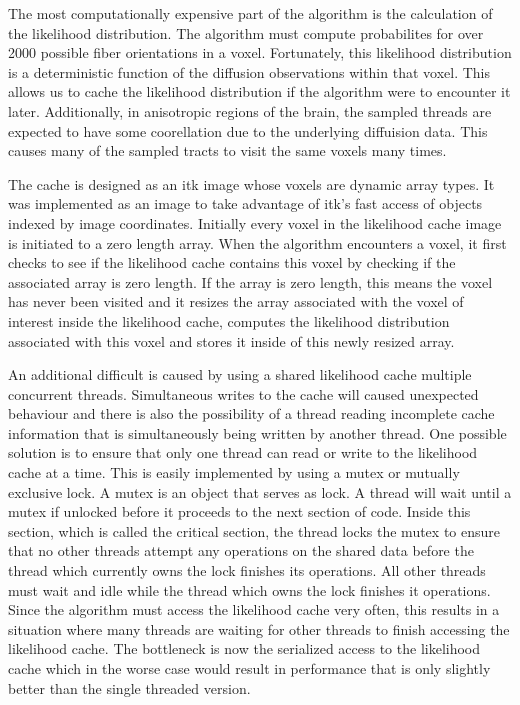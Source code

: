 The most computationally expensive part of the algorithm is the calculation of the likelihood distribution.  The algorithm must compute probabilites for over 2000 possible fiber orientations in a voxel.  Fortunately, this likelihood distribution is a deterministic function of the diffusion observations within that voxel.  This allows us to cache the likelihood distribution if the algorithm were to encounter it later.  Additionally, in anisotropic regions of the brain, the sampled threads are expected to have some coorellation due to the underlying diffuision data.  This causes many of the sampled tracts to visit the same voxels many times.  

The cache is designed as an itk image whose voxels are dynamic array types.  It was implemented as an image to take advantage of itk's fast access of objects indexed by image coordinates.  Initially every voxel in the likelihood cache image is initiated to a zero length array.  When the algorithm encounters a voxel, it first checks to see if the likelihood cache contains this voxel by checking if the associated array is zero length.  If the array is zero length, this means the voxel has never been visited and it resizes the array associated with the voxel of interest inside the likelihood cache, computes the likelihood distribution associated with this voxel and stores it inside of this newly resized array.

An additional difficult is caused by using a shared likelihood cache multiple concurrent threads.  Simultaneous writes to the cache will caused unexpected behaviour and there is also the possibility of a thread reading incomplete cache information that is simultaneously being written by another thread.  One possible solution is to ensure that only one thread can read or write to the likelihood cache at a time.  This is easily implemented by using a mutex or mutually exclusive lock.  A mutex is an object that serves as lock.  A thread will wait until a mutex if unlocked before it proceeds to the next section of code.  Inside this section, which is called the critical section, the thread locks the mutex to ensure that no other threads attempt any operations on the shared data before the thread which currently owns the lock finishes its operations.  All other threads must wait and idle while the thread which owns the lock finishes it operations.  Since the algorithm must access the likelihood cache very often, this results in a situation where many threads are waiting for other threads to finish accessing the likelihood cache.  The bottleneck is now the serialized access to the likelihood cache which in the worse case would result in performance that is only slightly better than the single threaded version.

